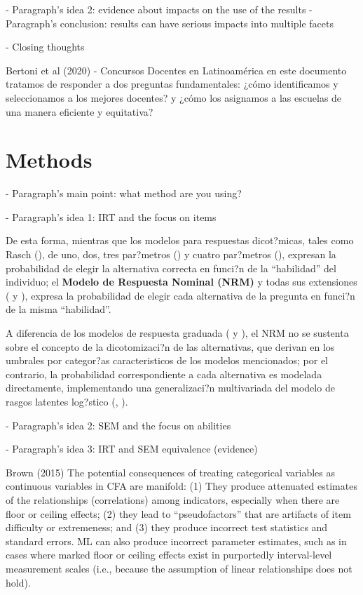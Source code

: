 - Paragraph's idea 2: evidence about impacts on the use of the results
- Paragraph's conclusion: results can have serious impacts into multiple facets




- Closing thoughts

Bertoni et al (2020) - Concursos Docentes en Latinoamérica
en este documento tratamos de responder a dos preguntas fundamentales: ¿cómo identificamos y seleccionamos a los mejores docentes? y ¿cómo los asignamos a las escuelas de una manera eficiente y equitativa? 



\section{Methods}

- Paragraph's main point: what method are you using?


- Paragraph's idea 1: IRT and the focus on items

De esta forma, mientras que los modelos para respuestas dicot?micas, tales como Rasch (\citealp{Rasch1980}), de uno, dos, tres par?metros (\citealp{Lord_Nov2008}) y cuatro par?metros (\citealp{McDonald1967}), expresan la probabilidad de elegir la alternativa correcta en funci?n de la ``habilidad'' del individuo; el \textbf{Modelo de Respuesta Nominal (NRM)} y todas sus extensiones (\citealt{Bock1972}  y \citealt[cap?tulo 2]{Linden1997}), expresa la probabilidad de elegir cada alternativa de la pregunta en funci?n de la misma ``habilidad''.

A diferencia de los modelos de respuesta graduada (\citealt{Samejima1969, Samejima1972} y \citealt[cap?tulo 5]{Ham_Swam1991}), el NRM no se sustenta sobre el concepto de la dicotomizaci?n de las alternativas, que derivan en los umbrales por categor?as caracteristicos de los modelos mencionados; por el contrario, la probabilidad correspondiente a cada alternativa es modelada directamente, implementando una generalizaci?n multivariada del modelo de rasgos latentes log?stico (\citealt{Bock1972}, \citealt{Ostini2006}).

- Paragraph's idea 2: SEM and the focus on abilities


- Paragraph's idea 3: IRT and SEM equivalence (evidence)

Brown (2015)
The potential consequences of treating categorical variables as continuous variables in CFA are manifold: (1) They produce attenuated estimates of the relationships (correlations) among indicators, especially when there are floor or ceiling effects; (2) they lead to “pseudofactors” that are artifacts of item difficulty or extremeness; and (3) they produce incorrect test statistics and standard errors. ML can also produce  incorrect parameter estimates, such as in cases where marked floor or ceiling effects exist in purportedly interval-level measurement scales (i.e., because the assumption of linear relationships does not hold).


